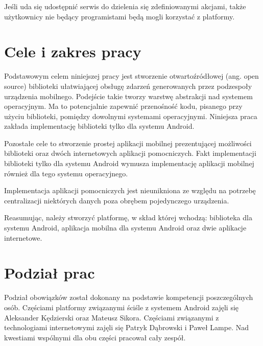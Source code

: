 \documentclass[11pt,a4paper,polish,thesis]{dcsbook}
\begin{document}
Jeśli uda się udostępnić serwis do dzielenia się zdefiniowanymi akcjami, także użytkownicy nie będący programistami będą mogli korzystać z platformy.
\section{Cele i zakres pracy}
Podstawowym celem niniejszej pracy jest stworzenie otwartoźródłowej (ang. open source) biblioteki ułatwiającej obsługę zdarzeń generowanych przez podzespoły
urządzenia mobilnego. Podejście takie tworzy warstwę abstrakcji nad systemem operacyjnym. Ma to potencjalnie zapewnić przenośność kodu, pisanego przy użyciu
biblioteki, pomiędzy dowolnymi systemami operacyjnymi. Niniejsza praca zakłada implementację biblioteki tylko dla systemu Android.

Pozostałe cele to stworzenie prostej aplikacji mobilnej prezentującej możliwości biblioteki oraz dwóch internetowych aplikacji pomocniczych. Fakt implementacji
biblioteki tylko dla systemu Android wymusza implementację aplikacji mobilnej również dla tego systemu operacyjnego.

Implementacja aplikacji pomocniczych jest nieunikniona ze względu na potrzebę centralizacji niektórych danych poza obrębem pojedynczego urządzenia.

Reasumując, należy stworzyć platformę, w skład której wchodzą: biblioteka dla systemu Android, aplikacja mobilna dla systemu Android oraz dwie aplikacje internetowe.
\section{Podział prac}
Podział obowiązków został dokonany na podstawie kompetencji poszczególnych osób. Częściami platformy związanymi ściśle z systemem Android zajęli się Aleksander
Kędzierski oraz Mateusz Sikora. Częściami związanymi z technologiami internetowymi zajęli się Patryk Dąbrowski i Paweł Lampe. Nad kwestiami wspólnymi dla obu części
pracował cały zespół.
\end{document}
